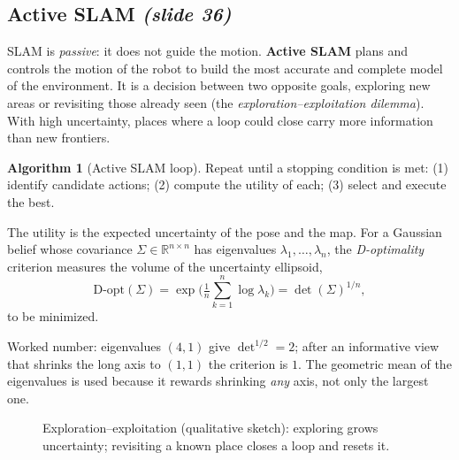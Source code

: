 \documentclass[11pt,a4paper]{article}
\newcommand{\slrs}[1]{\texorpdfstring{\emph{(slide #1)}}{(slide #1)}}
\newcommand{\R}{\mathbb{R}}
\theoremstyle{definition}
\newtheorem{algorithm}{Algorithm}[section]
\theoremstyle{plain}
\theoremstyle{remark}
\begin{document}
\subsection{Active SLAM \slrs{36}}
SLAM is \emph{passive}: it does not guide the motion. \textbf{Active SLAM} plans and controls the motion of the robot to build the most accurate and complete model of the environment. It is a decision between two opposite goals, exploring new areas or revisiting those already seen (the \emph{exploration--exploitation dilemma}). With high uncertainty, places where a loop could close carry more information than new frontiers.
\begin{algorithm}[Active SLAM loop]\label{alg:active}
Repeat until a stopping condition is met: (1) identify candidate actions; (2) compute the utility of each; (3) select and execute the best.
\end{algorithm}
The utility is the expected uncertainty of the pose and the map. For a Gaussian belief whose covariance $\Sigma\in\R^{n\times n}$ has eigenvalues $\lambda_1,\dots,\lambda_n$, the \emph{D-optimality} criterion measures the volume of the uncertainty ellipsoid,
\[
\text{D-opt}(\Sigma)=\exp\!\Big(\tfrac1n\sum_{k=1}^n\log\lambda_k\Big)=\det(\Sigma)^{1/n},
\]
to be minimized.
\begin{intuition}
Worked number: eigenvalues $(4,1)$ give $\det^{1/2}=2$; after an informative view that shrinks the long axis to $(1,1)$ the criterion is $1$. The geometric mean of the eigenvalues is used because it rewards shrinking \emph{any} axis, not only the largest one.
\end{intuition}
\begin{figure}[htbp]\centering
{}
\caption{Exploration--exploitation (qualitative sketch): exploring grows uncertainty; revisiting a known place closes a loop and resets it.}
\end{figure}
\end{document}
